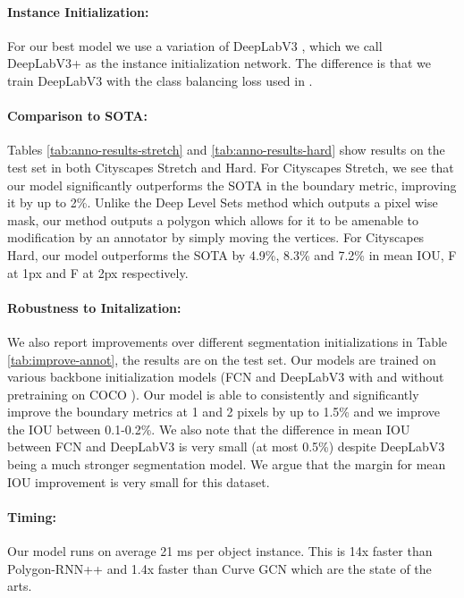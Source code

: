 \documentclass[10pt,twocolumn,letterpaper]{article}
\begin{document}
\vspace{-.4mm}


\paragraph{Instance Initialization:}
For our best model we use a variation of DeepLabV3 \cite{deeplabv3}, which we call DeepLabV3+ as the instance initialization network. The difference is that we train DeepLabV3 with the class balancing loss used in \cite{dextr}.

\vspace{-.4mm}


\paragraph{Comparison to SOTA:}
Tables \ref{tab:anno-results-stretch} and \ref{tab:anno-results-hard} show  results  on the test set in both Cityscapes Stretch and Hard. For Cityscapes Stretch, we see that our model significantly outperforms the SOTA in the boundary metric, improving it by up to 2\%. Unlike the Deep Level Sets \cite{wang2019delse} method which outputs a pixel wise mask, our method outputs a polygon which allows for it to be amenable to modification by an annotator by simply moving the vertices. For Cityscapes Hard, our model outperforms the SOTA by 4.9\%, 8.3\% and 7.2\% in mean IOU, F at 1px and F at 2px respectively. 

\paragraph{Robustness to Initalization:}
We also report  improvements over different segmentation initializations  in Table \ref{tab:improve-annot}, the results are on the test set. Our models are trained on various backbone initialization models (FCN \cite{fcn} and DeepLabV3  \cite{deeplabv3} with and without pretraining on COCO \cite{coco}). Our model is able to consistently and significantly improve the boundary metrics at 1 and 2 pixels by up to 1.5\% and we improve the  IOU between 0.1-0.2\%. We also note that the difference in mean IOU between FCN and DeepLabV3 is very small (at most 0.5\%) despite DeepLabV3 being a much stronger segmentation model. We argue that the margin for mean IOU improvement is very small for this dataset. 

\vspace{-.4mm}

\paragraph{Timing:}
Our model runs on average 21 ms per object instance. This is 14x faster than Polygon-RNN++ \cite{polygon-rnn++} and 1.4x faster than Curve GCN \cite{ling2019fast} which are the state of the arts.
\end{document}

